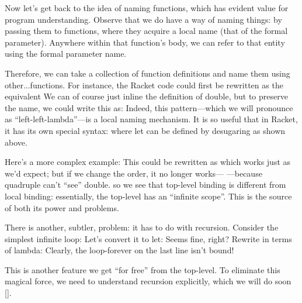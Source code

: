
Now let’s get back to the idea of naming functions, which has evident value for
program understanding. Observe that we do have a way of naming things: by
passing them to functions, where they acquire a local name (that of the formal
parameter). Anywhere within that function’s body, we can refer to that entity
using the formal parameter name.

Therefore, we can take a collection of function definitions and name them using
other...functions. For instance, the Racket code
could first be rewritten as the equivalent
We can of course just inline the definition of double, but to preserve the name,
we could write this as:
Indeed, this pattern—which we will pronounce as “left-left-lambda”—is a local
naming mechanism. It is so useful that in Racket, it has its own special syntax:
where let can be defined by desugaring as shown above.

Here’s a more complex example:
This could be rewritten as
which works just as we’d expect; but if we change the order, it no longer works—
—because quadruple can’t “see” double. so we see that top-level binding is
different from local binding: essentially, the top-level has an “infinite
scope”. This is the source of both its power and problems.

There is another, subtler, problem: it has to do with recursion. Consider the
simplest infinite loop:
Let’s convert it to let:
Seems fine, right? Rewrite in terms of lambda:
Clearly, the loop-forever on the last line isn’t bound!

This is another feature we get “for free” from the top-level. To eliminate this
magical force, we need to understand recursion explicitly, which we will do soon
\ref{}.